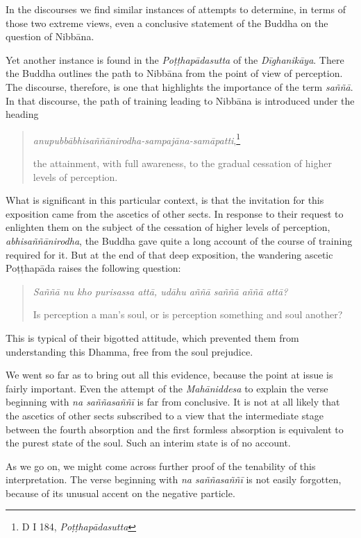 In the discourses we find similar instances of attempts to determine, in terms of those two extreme views, even a conclusive statement of the Buddha on the question of Nibbāna.

Yet another instance is found in the \emph{Poṭṭhapādasutta} of the \emph{Dīghanikāya}. There the Buddha outlines the path to Nibbāna from the point of view of perception. The discourse, therefore, is one that highlights the importance of the term \emph{saññā}. In that discourse, the path of training leading to Nibbāna is introduced under the heading

\begin{quote}
\emph{anupubbābhisaññānirodha-sampajāna-samāpatti},\footnote{D I 184, \emph{Poṭṭhapādasutta}}

the attainment, with full awareness, to the gradual cessation of higher levels of perception.
\end{quote}

What is significant in this particular context, is that the invitation for this exposition came from the ascetics of other sects. In response to their request to enlighten them on the subject of the cessation of higher levels of perception, \emph{abhisaññānirodha}, the Buddha gave quite a long account of the course of training required for it. But at the end of that deep exposition, the wandering ascetic Poṭṭhapāda raises the following question:

\begin{quote}
\emph{Saññā nu kho purisassa attā, udāhu aññā saññā aññā attā?}

Is perception a man's soul, or is perception something and soul another?
\end{quote}

This is typical of their bigotted attitude, which prevented them from understanding this Dhamma, free from the soul prejudice.

We went so far as to bring out all this evidence, because the point at issue is fairly important. Even the attempt of the \emph{Mahāniddesa} to explain the verse beginning with \emph{na saññasaññī} is far from conclusive. It is not at all likely that the ascetics of other sects subscribed to a view that the intermediate stage between the fourth absorption and the first formless absorption is equivalent to the purest state of the soul. Such an interim state is of no account.

As we go on, we might come across further proof of the tenability of this interpretation. The verse beginning with \emph{na saññasaññī} is not easily forgotten, because of its unusual accent on the negative particle.

